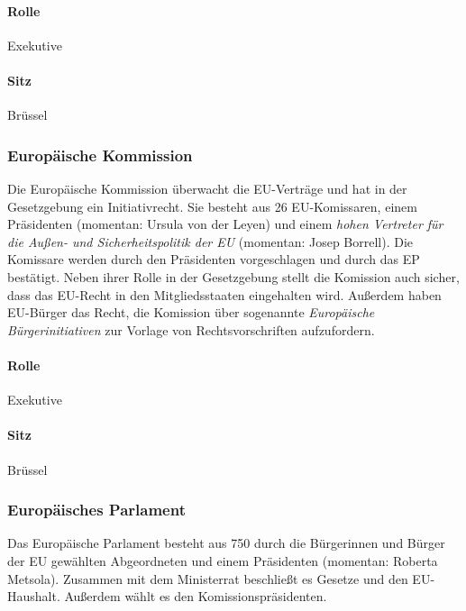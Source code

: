 \documentclass{article}
\begin{document}
	\paragraph{Rolle}
	Exekutive

	\paragraph{Sitz}
	Brüssel

	\subsubsection{Europäische Kommission}
	Die Europäische Kommission überwacht die EU-Verträge und hat in der Gesetzgebung ein Initiativrecht. Sie besteht aus 26 EU-Komissaren, einem Präsidenten (momentan: Ursula von der Leyen) und einem \textit{hohen Vertreter für die Außen- und Sicherheitspolitik der EU} (momentan: Josep Borrell). Die Komissare werden durch den Präsidenten vorgeschlagen und durch das EP bestätigt. Neben ihrer Rolle in der Gesetzgebung stellt die Komission auch sicher, dass das EU-Recht in den Mitgliedsstaaten eingehalten wird. Außerdem haben EU-Bürger das Recht, die Komission über sogenannte \textit{Europäische Bürgerinitiativen} zur Vorlage von Rechtsvorschriften aufzufordern.

	\paragraph{Rolle}
	Exekutive

	\paragraph{Sitz}
	Brüssel

	\subsubsection{Europäisches Parlament}
	Das Europäische Parlament besteht aus 750 durch die Bürgerinnen und Bürger der EU gewählten Abgeordneten und einem Präsidenten (momentan: Roberta Metsola). Zusammen mit dem Ministerrat beschließt es Gesetze und den EU-Haushalt. Außerdem wählt es den Komissionspräsidenten.
\end{document}
